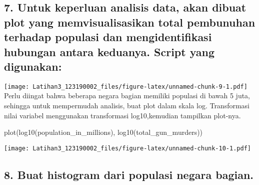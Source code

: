 \documentclass[
]{article}
\newenvironment{Shaded}{\begin{snugshade}}{\end{snugshade}}
\newcommand{\DecValTok}[1]{\textcolor[rgb]{0.00,0.00,0.81}{#1}}
\newcommand{\FunctionTok}[1]{\textcolor[rgb]{0.00,0.00,0.00}{#1}}
\newcommand{\NormalTok}[1]{#1}
\newcommand{\OtherTok}[1]{\textcolor[rgb]{0.56,0.35,0.01}{#1}}
\newcommand{\SpecialCharTok}[1]{\textcolor[rgb]{0.00,0.00,0.00}{#1}}
\begin{document}
\hypertarget{untuk-keperluan-analisis-data-akan-dibuat-plot-yang-memvisualisasikan-total-pembunuhan-terhadap-populasi-dan-mengidentifikasi-hubungan-antara-keduanya.-script-yang-digunakan}{%
\subsection{7. Untuk keperluan analisis data, akan dibuat plot yang
memvisualisasikan total pembunuhan terhadap populasi dan
mengidentifikasi hubungan antara keduanya. Script yang
digunakan:}\label{untuk-keperluan-analisis-data-akan-dibuat-plot-yang-memvisualisasikan-total-pembunuhan-terhadap-populasi-dan-mengidentifikasi-hubungan-antara-keduanya.-script-yang-digunakan}}

\begin{Shaded}
\end{Shaded}

\texttt{[image: Latihan3\_123190002\_files/figure-latex/unnamed-chunk-9-1.pdf]}
Perlu diingat bahwa beberapa negara bagian memiliki populasi di bawah 5
juta, sehingga untuk mempermudah analisis, buat plot dalam skala log.
Transformasi nilai variabel menggunakan transformasi log10,kemudian
tampilkan plot-nya.

\begin{Shaded}
\begin{Highlighting}[]
\FunctionTok{plot}\NormalTok{(}\FunctionTok{log10}\NormalTok{(population\_in\_millions), }\FunctionTok{log10}\NormalTok{(total\_gun\_murders))}
\end{Highlighting}
\end{Shaded}

\texttt{[image: Latihan3\_123190002\_files/figure-latex/unnamed-chunk-10-1.pdf]}

\hypertarget{buat-histogram-dari-populasi-negara-bagian.}{%
\subsection{8. Buat histogram dari populasi negara
bagian.}\label{buat-histogram-dari-populasi-negara-bagian.}}
\end{document}
